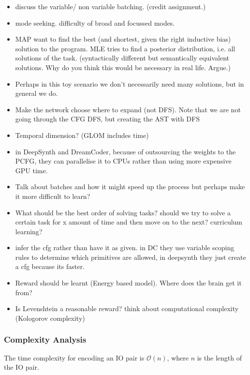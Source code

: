 \begin{itemize}
    \item discuss the variable/ non variable batching. (credit assignment.)
    \item mode seeking. difficulty of broad and focussed modes. 
    \item MAP want to find the best (and shortest, given the right inductive bias) solution to the program. MLE tries to find a posterior distribution, i.e. all solutions of the task. (syntactically different but semantically equivalent solutions. Why do you think this would be necessary in real life. Argue.) 
    \item Perhaps in this toy scenario we don't necessarily need many solutions, but in general we do. 
    \item Make the network choose where to expand (not DFS). Note that we are not going through the CFG DFS, but creating the AST with DFS
    \item Temporal dimension? (GLOM includes time)
    \item in DeepSynth and DreamCoder, because of outsourcing the weights to the PCFG, they can parallelise it to CPUs rather than using more expensive GPU time. 
    \item Talk about batches and how it might speed up the process but perhaps make it more difficult to learn?
    \item What should be the best order of solving tasks? should we try to solve a certain task for x amount of time and then move on to the next? curriculum learning? 
    \item infer the cfg rather than have it as given. in DC they use variable scoping rules to determine which primitives are allowed, in deepsynth they just create a cfg because its faster. 
    \item Reward should be learnt (Energy based model). Where does the brain get it from?
    \item Is Levenshtein a reasonable reward? think about computational complexity (Kologorov complexity) 
\end{itemize}


\subsubsection{Complexity Analysis}

The time complexity for encoding an IO pair is \(\mathcal{O}(n)\), where \(n\) is the length of the IO pair. 

